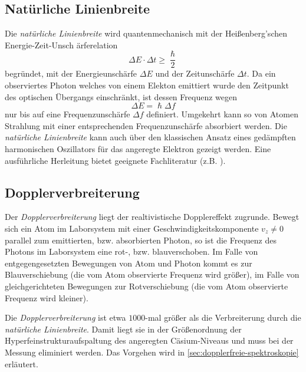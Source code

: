 \documentclass[../bericht.tex]{subfiles}
\begin{document}
      \subsection{Nat\"urliche Linienbreite}
      \label{subsec:natürliche-linienbreite}

        Die \textit{nat\"urliche Linienbreite} wird quantenmechanisch mit der Hei\ss{}enberg'schen Energie-Zeit-Unsch \"arferelation
        \begin{equation*}
          \Delta E \cdot \Delta t \ge \frac{\hslash}{2}
        \end{equation*}
        begründet, mit der Energieunschärfe $\Delta E$ und der Zeitunschärfe $\Delta t$. Da ein observiertes Photon welches von einem Elekton emittiert wurde den Zeitpunkt des optischen Übergangs einschränkt, ist dessen Frequenz wegen
        \begin{equation*}
          \Delta E = \hslash \Delta f
        \end{equation*}
        nur bis auf eine Frequenzunschärfe $\Delta f$ definiert. Umgekehrt kann so von Atomen Strahlung mit einer entsprechenden Frequenzunschärfe absorbiert werden. Die \textit{nat\"urliche Linienbreite} kann auch über den klassischen Ansatz eines gedämpften harmonischen Oszillators für das angeregte Elektron gezeigt werden. Eine ausführliche Herleitung bietet geeignete Fachliteratur (z.B. \cite{dem:exp3-linienbreite}).


      \subsection{Dopplerverbreiterung}
      \label{subsec:dopplerverbreiterung}

        Der \textit{Dopplerverbreiterung} liegt der realtivistische Dopplereffekt zugrunde. Bewegt sich ein Atom im Laborsystem mit einer Geschwindigkeitskomponente $v_z\ne 0$ parallel zum emittierten, bzw. absorbierten Photon, so ist die Frequenz des Photons im Laborsystem eine rot-, bzw. blauverschoben. Im Falle von entgegengesetzten Bewegungen von Atom und Photon kommt es zur Blauverschiebung (die vom Atom observierte Frequenz wird gr\"o\ss{}er), im Falle von gleichgerichteten Bewegungen zur Rotverschiebung (die vom Atom observierte Frequenz wird kleiner).

        Die \textit{Dopplerverbreiterung} ist etwa $1000$-mal gr\"o\ss{}er als die Verbreiterung durch die \textit{nat\"urliche Linienbreite}. Damit liegt sie in der Gr\"o\ss{}enordnung der Hyperfeinstrukturaufspaltung des angeregten Cäsium-Niveaus und muss bei der Messung eliminiert werden. Das Vorgehen wird in \cref{sec:dopplerfreie-spektroskopie} erläutert.
\end{document}
